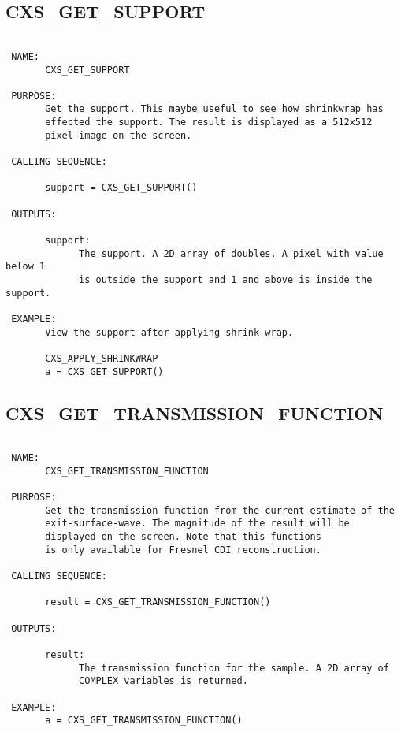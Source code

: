 
\subsection{CXS\_GET\_SUPPORT}
\begin{verbatim}

 NAME:
       CXS_GET_SUPPORT

 PURPOSE:
       Get the support. This maybe useful to see how shrinkwrap has
       effected the support. The result is displayed as a 512x512 
       pixel image on the screen.

 CALLING SEQUENCE:

       support = CXS_GET_SUPPORT()

 OUTPUTS:

       support:
             The support. A 2D array of doubles. A pixel with value below 1
             is outside the support and 1 and above is inside the support.

 EXAMPLE:
       View the support after applying shrink-wrap.
 
       CXS_APPLY_SHRINKWRAP
       a = CXS_GET_SUPPORT()

\end{verbatim}

\subsection{CXS\_GET\_TRANSMISSION\_FUNCTION}
\begin{verbatim}

 NAME:
       CXS_GET_TRANSMISSION_FUNCTION

 PURPOSE:
       Get the transmission function from the current estimate of the
       exit-surface-wave. The magnitude of the result will be
       displayed on the screen. Note that this functions
       is only available for Fresnel CDI reconstruction.

 CALLING SEQUENCE:

       result = CXS_GET_TRANSMISSION_FUNCTION()

 OUTPUTS:

       result:
             The transmission function for the sample. A 2D array of
             COMPLEX variables is returned. 

 EXAMPLE:
       a = CXS_GET_TRANSMISSION_FUNCTION()

\end{verbatim}

 
